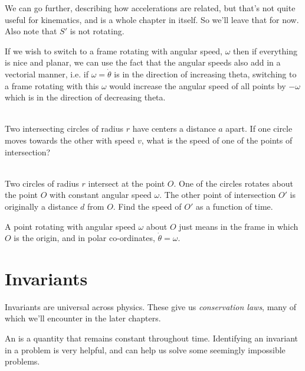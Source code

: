     We can go further, describing how accelerations are related, but that's not quite useful for kinematics, and 
    is a whole chapter in itself. So we'll leave that for now. Also note that $S'$ is not rotating.

    If we wish to switch to a frame rotating with angular speed, $\omega$ then if everything is nice and planar, 
    we can use the fact that the angular speeds also add in a vectorial manner, i.e. if $\omega = \dot{\theta}$
    is in the direction of increasing theta, switching to a frame rotating with this $\omega$ would increase 
    the angular speed of all points by $-\omega$ which is in the direction of decreasing theta.

    \begin{exc}
        \begin{exercise}[subtitle={Symmetrical Circles, Kalda}, points = 2]
            \smallskip
            ~\\
            Two intersecting circles of radius $r$ have centers a distance $a$ apart. If one circle moves towards the other with 
            speed $v$, what is the speed of one of the points of intersection?
        \end{exercise}
        \begin{exercise}[subtitle={Rotating Circles, Kalda}, points = 3]
            \smallskip
            ~\\
            Two circles of radius $r$ intersect at the point $O$. One of the circles rotates
            about the point $O$ with constant angular speed $\omega$. The other point of intersection $O'$ is originally a
            distance $d$ from $O$. Find the speed of $O'$ as a function of time.

            A point rotating with angular speed $\omega$ about $O$ just means in the frame in which $O$ is the origin, 
            and in polar co-ordinates, $\dot{\theta} = \omega$. 
        \end{exercise}
    \end{exc}

    \section{Invariants}

    Invariants are universal across physics. These give us \emph{conservation laws}, many of which we'll encounter in the 
    later chapters.

    An  is a quantity that remains constant throughout time. Identifying an invariant in a problem is very
    helpful, and can help us solve some seemingly impossible problems. 

